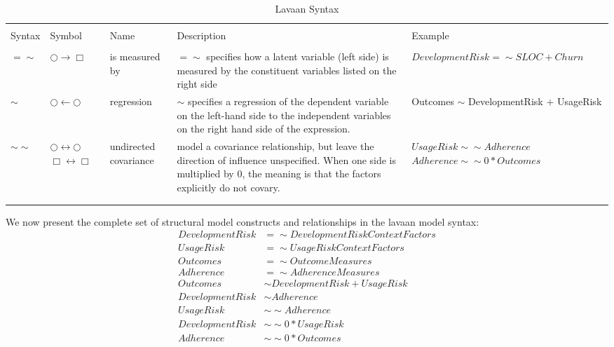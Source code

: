 \begin{table}[!htbp] \centering 
	\caption{Lavaan Syntax} 
	\label{tab:model_lavaan_syntax} 
	\begin{small}
		\begin{tabular}{p{.75cm}p{1.25cm}p{1.5cm}p{3.5cm}p{2.5cm}} 
			&&&&\\[-1.8ex]\hline 
			\hline&&&& \\[-1.8ex] 
			Syntax & Symbol & Name & Description & Example \\ 
			\hline &&&&\\[-1.8ex]  
			$=\sim$	& $\bigcirc \rightarrow \Box$ & is measured by & $=\sim$ specifies how a latent variable (left side) is measured by the constituent variables listed on the right side & $DevelopmentRisk =\sim SLOC + Churn$\\	
			 $\sim$ & $\bigcirc \leftarrow \bigcirc$ & regression & $\sim$ specifies a regression of the dependent variable on the left-hand side to the independent variables on the right hand side of the expression. & Outcomes $\sim$ DevelopmentRisk $+$ UsageRisk  \\	
			 $\sim\sim$ & $\bigcirc \leftrightarrow \bigcirc$ $\Box \leftrightarrow \Box$ & undirected covariance & model a covariance relationship, but leave the direction of influence unspecified. When one side is multiplied by 0, the meaning is that the factors  explicitly do not covary. & $UsageRisk \sim\sim Adherence$  $Adherence \sim\sim 0*Outcomes$\\
			\hline &&&&\\[-1.8ex] 
			\hline &&&&\\[-1.8ex] 
		\end{tabular} 
	\end{small}
\end{table} 
We now present the complete set of structural model constructs and relationships in the lavaan model syntax: 
 \begin{equation} \label{eq:1}
 \begin{split}
 DevelopmentRisk &=\sim DevelopmentRiskContextFactors\\ 
  UsageRisk &=\sim UsageRiskContextFactors\\
  Outcomes &=\sim OutcomeMeasures\\
  Adherence &=\sim AdherenceMeasures\\
  Outcomes &\sim DevelopmentRisk + UsageRisk\\
   DevelopmentRisk &\sim Adherence\\
   UsageRisk &\sim\sim  Adherence\\
   DevelopmentRisk &\sim\sim 0*UsageRisk\\
   Adherence &\sim\sim 0*Outcomes\\
 \end{split}
 \end{equation}     



